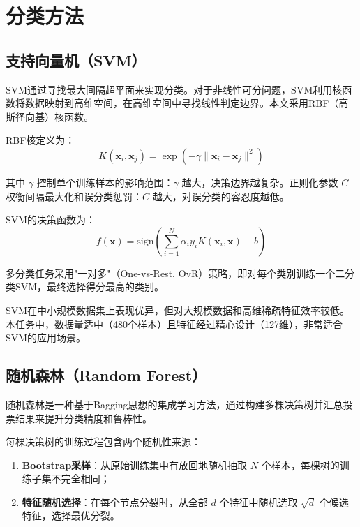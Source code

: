 \documentclass[12pt,a4paper]{ctexart}
\begin{document}
\section{分类方法}

\subsection{支持向量机（SVM）}

SVM通过寻找最大间隔超平面来实现分类。对于非线性可分问题，SVM利用核函数将数据映射到高维空间，在高维空间中寻找线性判定边界。本文采用RBF（高斯径向基）核函数。

RBF核定义为：
\begin{equation}
    K(\mathbf{x}_i, \mathbf{x}_j) = \exp\left(-\gamma \|\mathbf{x}_i - \mathbf{x}_j\|^2\right)
\end{equation}

其中 $\gamma$ 控制单个训练样本的影响范围：$\gamma$ 越大，决策边界越复杂。正则化参数 $C$ 权衡间隔最大化和误分类惩罚：$C$ 越大，对误分类的容忍度越低。

SVM的决策函数为：
\begin{equation}
    f(\mathbf{x}) = \text{sign}\left(\sum_{i=1}^{N} \alpha_i y_i K(\mathbf{x}_i, \mathbf{x}) + b\right)
\end{equation}

多分类任务采用"一对多"（One-vs-Rest, OvR）策略，即对每个类别训练一个二分类SVM，最终选择得分最高的类别。

SVM在中小规模数据集上表现优异，但对大规模数据和高维稀疏特征效率较低。本任务中，数据量适中（480个样本）且特征经过精心设计（127维），非常适合SVM的应用场景。

\subsection{随机森林（Random Forest）}

随机森林是一种基于Bagging思想的集成学习方法，通过构建多棵决策树并汇总投票结果来提升分类精度和鲁棒性。

每棵决策树的训练过程包含两个随机性来源：
\begin{enumerate}[label=(\arabic*)]
    \item \textbf{Bootstrap采样}：从原始训练集中有放回地随机抽取 $N$ 个样本，每棵树的训练子集不完全相同；
    \item \textbf{特征随机选择}：在每个节点分裂时，从全部 $d$ 个特征中随机选取 $\sqrt{d}$ 个候选特征，选择最优分裂。
\end{enumerate}
\end{document}
